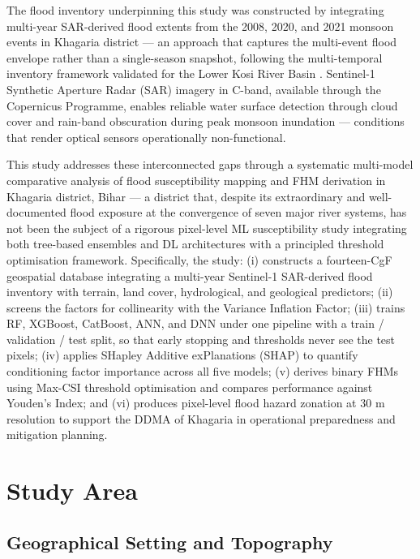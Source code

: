 \documentclass[12pt, a4paper]{article}
\begin{document}
The flood inventory underpinning this study was constructed by integrating multi-year SAR-derived flood extents from the 2008, 2020, and 2021 monsoon events in Khagaria district --- an approach that captures the multi-event flood envelope rather than a single-season snapshot, following the multi-temporal inventory framework validated for the Lower Kosi River Basin \citep{Arora2022SERRA}. Sentinel-1 Synthetic Aperture Radar (SAR) imagery in C-band, available through the Copernicus Programme, enables reliable water surface detection through cloud cover and rain-band obscuration during peak monsoon inundation \citep{Twele2016, DeVries2020, dasgupta2018} --- conditions that render optical sensors operationally non-functional.

This study addresses these interconnected gaps through a systematic multi-model comparative analysis of flood susceptibility mapping and FHM derivation in Khagaria district, Bihar --- a district that, despite its extraordinary and well-documented flood exposure at the convergence of seven major river systems, has not been the subject of a rigorous pixel-level ML susceptibility study integrating both tree-based ensembles and DL architectures with a principled threshold optimisation framework. Specifically, the study: (i) constructs a fourteen-CgF geospatial database integrating a multi-year Sentinel-1 SAR-derived flood inventory with terrain, land cover, hydrological, and geological predictors; (ii) screens the factors for collinearity with the Variance Inflation Factor; (iii) trains RF, XGBoost, CatBoost, ANN, and DNN under one pipeline with a train / validation / test split, so that early stopping and thresholds never see the test pixels; (iv) applies SHapley Additive exPlanations (SHAP) to quantify conditioning factor importance across all five models;  (v) derives binary FHMs using Max-CSI threshold optimisation and compares performance against Youden's Index; and (vi) produces pixel-level flood hazard zonation at 30 m resolution to support the DDMA of Khagaria in operational preparedness and mitigation planning.

\section{Study Area}

\subsection{Geographical Setting and Topography}
\end{document}

